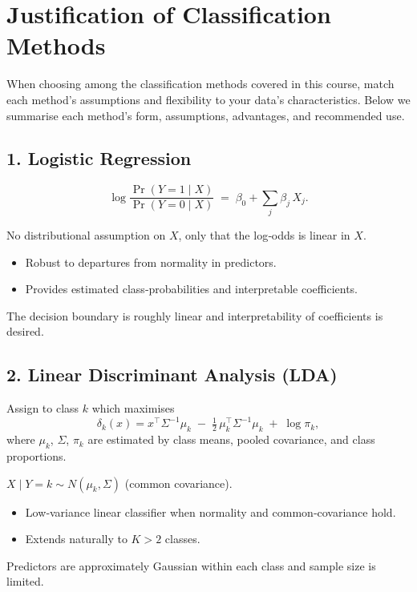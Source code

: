 \documentclass{article}
\begin{document}
\pagebreak

\section{Justification of Classification Methods}

When choosing among the classification methods covered in this course, match each method’s assumptions and flexibility to your data’s characteristics. Below we summarise each method’s form, assumptions, advantages, and recommended use.

\subsection{1. Logistic Regression}
\begin{description}[leftmargin=!,labelwidth=\widthof{\bfseries Form:}]
  \item[Form:] 
    \[
      \log\frac{\Pr(Y=1 \mid X)}{\Pr(Y=0 \mid X)}
      \;=\;\beta_0 + \sum_{j}\beta_j\,X_j.
    \]
  \item[Assumptions:] 
    No distributional assumption on $X$, only that the log‐odds is linear in $X$.
  \item[Pros:]
    \begin{itemize}[noitemsep]
      \item Robust to departures from normality in predictors.
      \item Provides estimated class‐probabilities and interpretable coefficients.
    \end{itemize}
  \item[Use when:] 
    The decision boundary is roughly linear and interpretability of coefficients is desired.
\end{description}

\subsection{2. Linear Discriminant Analysis (LDA)}
\begin{description}[leftmargin=!,labelwidth=\widthof{\bfseries Form:}]
  \item[Form:]
    Assign to class $k$ which maximises
    \[
      \delta_k(x)
      = x^\top \Sigma^{-1}\mu_k
      \;-\;\tfrac12\,\mu_k^\top\Sigma^{-1}\mu_k
      \;+\;\log\pi_k,
    \]
    where $\mu_k$, $\Sigma$, $\pi_k$ are estimated by class means, pooled covariance, and class proportions.
  \item[Assumptions:] 
    $X \mid Y=k \sim N(\mu_k,\Sigma)$ (common covariance).
  \item[Pros:]
    \begin{itemize}[noitemsep]
      \item Low‐variance linear classifier when normality and common‐covariance hold.
      \item Extends naturally to $K>2$ classes.
    \end{itemize}
  \item[Use when:] 
    Predictors are approximately Gaussian within each class and sample size is limited.
\end{description}
\end{document}
